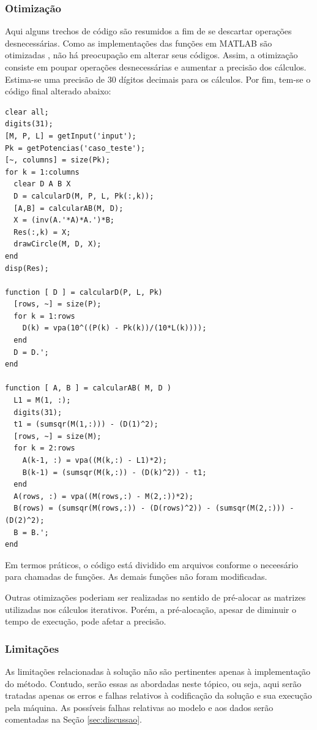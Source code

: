 	\subsubsection{Otimização}
	\label{sec:opt}
	Aqui alguns trechos de código são resumidos a fim de se descartar operações desnecessárias.
	Como as implementações das funções em MATLAB são otimizadas \cite{matlabguide}, não há preocupação
	em alterar seus códigos. Assim, a otimização consiste em poupar operações desnecessárias e aumentar
	a precisão dos cálculos. Estima-se uma precisão de $30$ dígitos decimais para os cálculos. Por fim,
	tem-se o código final alterado abaixo:
	\begin{Verbatim}[fontsize=\footnotesize]
clear all;
digits(31);
[M, P, L] = getInput('input');
Pk = getPotencias('caso_teste');
[~, columns] = size(Pk);
for k = 1:columns
  clear D A B X
  D = calcularD(M, P, L, Pk(:,k));
  [A,B] = calcularAB(M, D);
  X = (inv(A.'*A)*A.')*B;
  Res(:,k) = X;
  drawCircle(M, D, X);
end
disp(Res);

function [ D ] = calcularD(P, L, Pk)
  [rows, ~] = size(P);
  for k = 1:rows
    D(k) = vpa(10^((P(k) - Pk(k))/(10*L(k))));
  end
  D = D.';
end

function [ A, B ] = calcularAB( M, D )
  L1 = M(1, :);
  digits(31);
  t1 = (sumsqr(M(1,:))) - (D(1)^2);
  [rows, ~] = size(M);
  for k = 2:rows
    A(k-1, :) = vpa((M(k,:) - L1)*2);
    B(k-1) = (sumsqr(M(k,:)) - (D(k)^2)) - t1;
  end
  A(rows, :) = vpa((M(rows,:) - M(2,:))*2);
  B(rows) = (sumsqr(M(rows,:)) - (D(rows)^2)) - (sumsqr(M(2,:))) - (D(2)^2);
  B = B.';
end
	\end{Verbatim}

	Em termos práticos, o código está dividido em arquivos conforme o neceesário para chamadas de funções.
	As demais funções não foram modificadas.

	Outras otimizações poderiam ser realizadas no sentido de pré-alocar as matrizes utilizadas nos cálculos iterativos.
	Porém, a pré-alocação, apesar de diminuir o tempo de execução, pode afetar a precisão.

	\subsubsection{Limitações}
	\label{sec:lim}
	As limitações relacionadas à solução não são pertinentes apenas à implementação do método. Contudo,
	serão essas as abordadas neste tópico, ou seja, aqui serão tratadas apenas os erros e falhas relativos
	à codificação da solução e sua execução pela máquina. As possíveis falhas relativas ao modelo e aos
	dados serão comentadas na Seção \ref{sec:discussao}.

